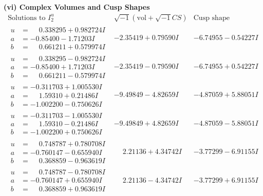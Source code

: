 \documentclass[1p]{elsarticle_modified}
\theoremstyle{definition}
\newcommand{\I}{\sqrt{-1}}
\begin{document}
\newpage\flushleft \textbf{(vi) Complex Volumes and Cusp Shapes}
$$\begin{array}{c|c|c}  
\text{Solutions to }I^u_{2}& \I (\text{vol} + \sqrt{-1}CS) & \text{Cusp shape}\\
 \hline 
\begin{aligned}
u &= \phantom{-}0.338295 + 0.982724 I \\
a &= -0.85400 - 1.71203 I \\
b &= \phantom{-}0.661211 + 0.579974 I\end{aligned}
 & -2.35419 + 0.79590 I & -6.74955 - 0.54227 I \\ \hline\begin{aligned}
u &= \phantom{-}0.338295 - 0.982724 I \\
a &= -0.85400 + 1.71203 I \\
b &= \phantom{-}0.661211 - 0.579974 I\end{aligned}
 & -2.35419 - 0.79590 I & -6.74955 + 0.54227 I \\ \hline\begin{aligned}
u &= -0.311703 + 1.005530 I \\
a &= \phantom{-}1.59310 + 0.21486 I \\
b &= -1.002200 - 0.750626 I\end{aligned}
 & -9.49849 - 4.82659 I & -4.87059 + 5.88051 I \\ \hline\begin{aligned}
u &= -0.311703 - 1.005530 I \\
a &= \phantom{-}1.59310 - 0.21486 I \\
b &= -1.002200 + 0.750626 I\end{aligned}
 & -9.49849 + 4.82659 I & -4.87059 - 5.88051 I \\ \hline\begin{aligned}
u &= \phantom{-}0.748787 + 0.780708 I \\
a &= -0.760147 - 0.655940 I \\
b &= \phantom{-}0.368859 - 0.963619 I\end{aligned}
 & \phantom{-}2.21136 + 4.34742 I & -3.77299 - 6.91155 I \\ \hline\begin{aligned}
u &= \phantom{-}0.748787 - 0.780708 I \\
a &= -0.760147 + 0.655940 I \\
b &= \phantom{-}0.368859 + 0.963619 I\end{aligned}
 & \phantom{-}2.21136 - 4.34742 I & -3.77299 + 6.91155 I \\ \hline\begin{aligned}

\end{aligned}
\end{array}$$
\end{document}
